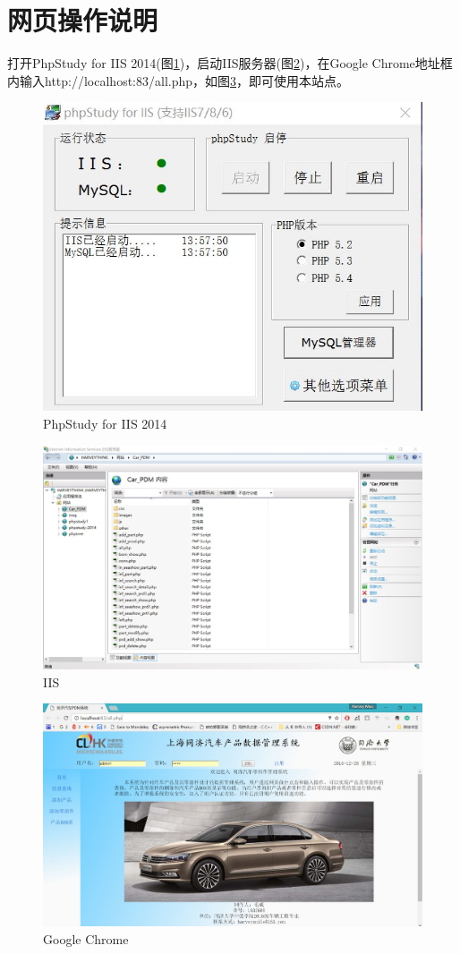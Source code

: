 \section{网页操作说明}
打开PhpStudy for IIS 2014(图\ref{fig:phpstudy})，启动IIS服务器(图\ref{fig:IIS})，在Google Chrome地址框内输入http://localhost:83/all.php，如图\ref{fig:allphp}，即可使用本站点。
\begin{figure}[H]
\centering
\includegraphics[width=0.7\linewidth]{figure/phpstudy}
\caption{PhpStudy for IIS 2014}
\label{fig:phpstudy}
\end{figure}

\begin{figure}[H]
\centering
\includegraphics[width=0.7\linewidth]{figure/IIS}
\caption{IIS}
\label{fig:IIS}
\end{figure}

\begin{figure}[H]
\centering
\includegraphics[width=0.9\linewidth]{figure/allphp}
\caption{Google Chrome}
\label{fig:allphp}
\end{figure}



